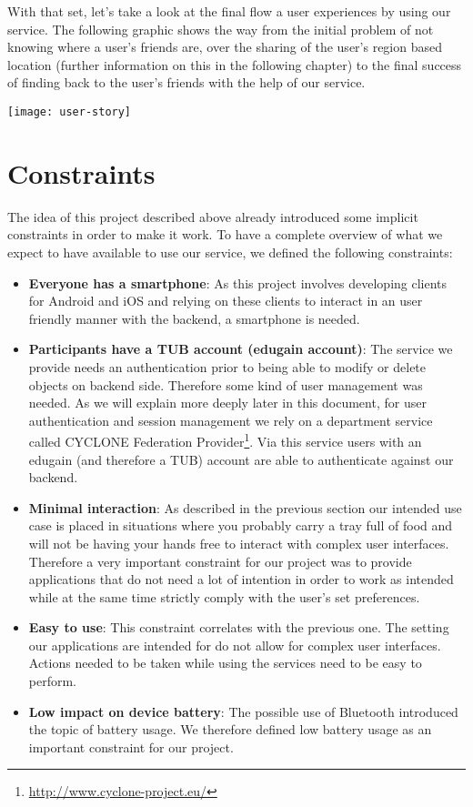 With that set, let's take a look at the final flow a user experiences by using our service. The following graphic shows the way from the initial problem of not knowing where a user's friends are, over the sharing of the user's region based location (further information on this in the following chapter) to the final success of finding back to the user's friends with the help of our service.

\begin{center}
    \texttt{[image: user-story]}\\
\end{center}


\section{Constraints}

The idea of this project described above already introduced some implicit constraints in order to make it work. To have a complete overview of what we expect to have available to use our service, we defined the following constraints:

\begin{itemize}
    \item \textbf{Everyone has a smartphone}: As this project involves developing clients for Android and iOS and relying on these clients to interact in an user friendly manner with the backend, a smartphone is needed.
    \item \textbf{Participants have a TUB account (edugain account)}: The service we provide needs an authentication prior to being able to modify or delete objects on backend side. Therefore some kind of user management was needed. As we will explain more deeply later in this document, for user authentication and session management we rely on a department service called CYCLONE Federation Provider\footnote{\url{http://www.cyclone-project.eu/}}. Via this service users with an edugain (and therefore a TUB) account are able to authenticate against our backend.
    \item \textbf{Minimal interaction}: As described in the previous section our intended use case is placed in situations where you probably carry a tray full of food and will not be having your hands free to interact with complex user interfaces. Therefore a very important constraint for our project was to provide applications that do not need a lot of intention in order to work as intended while at the same time strictly comply with the user's set preferences.
    \item \textbf{Easy to use}: This constraint correlates with the previous one. The setting our applications are intended for do not allow for complex user interfaces. Actions needed to be taken while using the services need to be easy to perform.
    \item \textbf{Low impact on device battery}: The possible use of Bluetooth introduced the topic of battery usage. We therefore defined low battery usage as an important constraint for our project.
\end{itemize}


